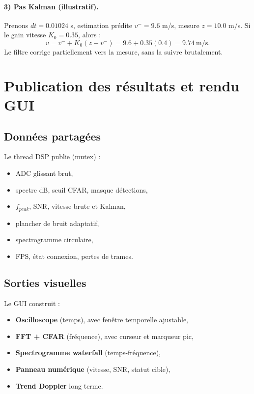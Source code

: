 \documentclass[a4paper,11pt]{article}
\begin{document}
\paragraph{3) Pas Kalman (illustratif).}
Prenons \(dt=0.01024\) s, estimation pr\'edite \(v^- = 9.6\) m/s, mesure \(z=10.0\) m/s.
Si le gain vitesse \(K_0=0.35\), alors :
\[
v = v^- + K_0(z-v^-)
= 9.6 + 0.35(0.4)
= 9.74\ \text{m/s}.
\]
Le filtre corrige partiellement vers la mesure, sans la suivre brutalement.

\section{Publication des r\'esultats et rendu GUI}

\subsection{Donn\'ees partag\'ees}

Le thread DSP publie (mutex) :
\begin{itemize}[leftmargin=2em]
  \item ADC glissant brut,
  \item spectre dB, seuil CFAR, masque d\'etections,
  \item \(f_{peak}\), SNR, vitesse brute et Kalman,
  \item plancher de bruit adaptatif,
  \item spectrogramme circulaire,
  \item FPS, \'etat connexion, pertes de trames.
\end{itemize}

\subsection{Sorties visuelles}

Le GUI construit :
\begin{itemize}[leftmargin=2em]
  \item \textbf{Oscilloscope} (temps), avec fen\^etre temporelle ajustable,
  \item \textbf{FFT + CFAR} (fr\'equence), avec curseur et marqueur pic,
  \item \textbf{Spectrogramme waterfall} (temps-fr\'equence),
  \item \textbf{Panneau num\'erique} (vitesse, SNR, statut cible),
  \item \textbf{Trend Doppler} long terme.
\end{itemize}
\end{document}
